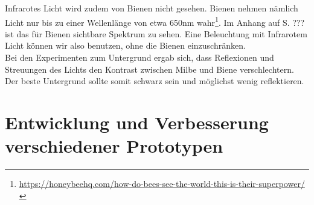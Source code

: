 \documentclass[11pt,a4paper]{article}
\begin{document}
Infrarotes Licht wird zudem von Bienen nicht gesehen. Bienen nehmen nämlich Licht nur bis zu einer Wellenlänge von etwa 650nm wahr\footnote{\url{https://honeybeehq.com/how-do-bees-see-the-world-this-is-their-superpower/}}. Im Anhang auf S. ??? ist das für Bienen sichtbare Spektrum zu sehen. Eine Beleuchtung mit Infrarotem Licht können wir also benutzen, ohne die Bienen einzuschränken.\\
Bei den Experimenten zum Untergrund ergab sich, dass Reflexionen und Streuungen des Lichts den Kontrast zwischen Milbe und Biene verschlechtern. Der beste Untergrund sollte somit schwarz sein und möglichst wenig reflektieren.


\newpage
\section{Entwicklung und Verbesserung verschiedener Prototypen}
\end{document}
